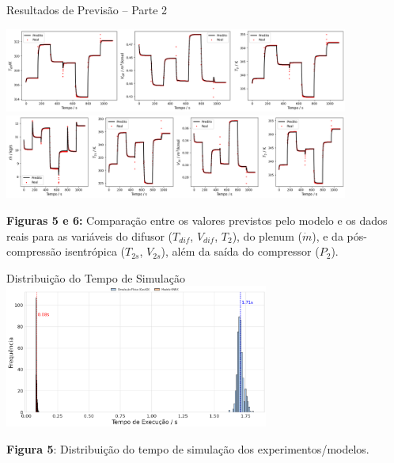 \begin{frame}{Resultados de Previsão – Parte 2}
\scriptsize

\begin{center}
    \includegraphics[width=0.85\textwidth]{figures/dados3.png} 
    \includegraphics[width=0.85\textwidth]{figures/dados4.png}
\end{center}



{\centering
\tiny
\textbf{Figuras 5 e 6:} Comparação entre os valores previstos pelo modelo e os dados reais para as variáveis do difusor ($T_{dif}$, $V_{dif}$, $T_2$), do plenum ($\dot{m}$), e da pós-compressão isentrópica ($T_{2s}$, $V_{2s}$), além da saída do compressor ($P_2$).
}

\end{frame}



\begin{frame}{Distribuição do Tempo de Simulação}
\centering
\includegraphics[width=0.65\textwidth]{figures/hist.png}

\vspace{0.3cm}
{\scriptsize \textbf{Figura 5}: Distribuição do tempo de simulação dos experimentos/modelos.}
\end{frame}




